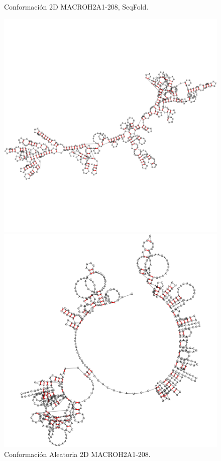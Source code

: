 \documentclass[a4paper,11pt,titlepage]{article}
\theoremstyle{definition}
\begin{document}
\begin{figure}[H]
\begin{minipage}[c]{0.23\textwidth}
        \caption{Conformación 2D MACROH2A1-208, SeqFold.}
        \label{fig:MACROH2A1-208-sqf}
    \end{minipage}
    \hfill
    \begin{minipage}[c]{0.23\textwidth}
        \centering
        \includegraphics[width=\textwidth]{images/MACROH2A1-208-db_rndc.png}
        \caption{Conformación Aleatoria 2D MACROH2A1-208.}
        \label{fig:MACROH2A1-208-rndc}
    \end{minipage}
    \hfill
    \begin{minipage}[c]{0.23\textwidth}
        \centering
        \includegraphics[width=\textwidth]{images/MACROH2A1-208-db_one_conf.png}

\end{minipage}
\end{figure}
\end{document}

